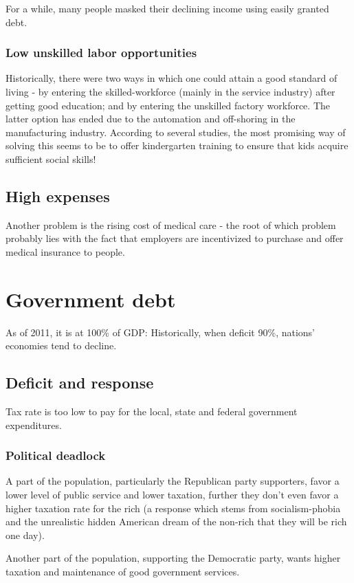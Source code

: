 \documentclass[oneside, article]{memoir}
\begin{document}
For a while, many people masked their declining income using easily granted debt.

\subsubsection{Low unskilled labor opportunities}
Historically, there were two ways in which one could attain a good standard of living - by entering the skilled-workforce (mainly in the service industry) after getting good education; and by entering the unskilled factory workforce. The latter option has ended due to the automation and off-shoring in the manufacturing industry. According to several studies, the most promising way of solving this seems to be to offer kindergarten training to ensure that kids acquire sufficient social skills!

\subsection{High expenses}
Another problem is the rising cost of medical care - the root of which problem probably lies with the fact that employers are incentivized to purchase and offer medical insurance to people.

\section{Government debt}
As of 2011, it is at 100\% of GDP: Historically, when deficit 90\%, nations' economies tend to decline.

\subsection{Deficit and response}
Tax rate is too low to pay for the local, state and federal government expenditures.

\subsubsection{Political deadlock}
A part of the population, particularly the Republican party supporters, favor a lower level of public service and lower taxation, further they don't even favor a higher taxation rate for the rich (a response which stems from socialism-phobia and the unrealistic hidden American dream of the non-rich that they will be rich one day).

Another part of the population, supporting the Democratic party, wants higher taxation and maintenance of good government services.
\end{document}
